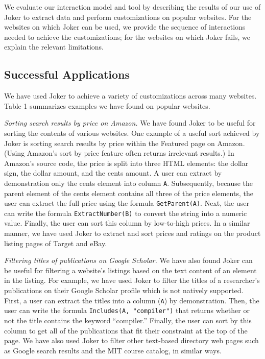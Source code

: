 \documentclass[sigconf,10pt]{acmart}
\begin{document}
We evaluate our interaction model and tool by describing the results of
our use of Joker to extract data and perform customizations on popular
websites. For the websites on which Joker can be used, we provide the
sequence of interactions needed to achieve the customizations; for the
websites on which Joker fails, we explain the relevant limitations.

\hypertarget{successful-applications}{%
\subsection{Successful Applications}\label{successful-applications}}

We have used Joker to achieve a variety of customizations across many
websites. Table 1 summarizes examples we have found on popular websites.

\emph{Sorting search results by price on Amazon.} We have found Joker to
be useful for sorting the contents of various websites. One example of a
useful sort achieved by Joker is sorting search results by price within
the Featured page on Amazon. (Using Amazon's sort by price feature often
returns irrelevant results.) In Amazon's source code, the price is split
into three HTML elements: the dollar sign, the dollar amount, and the
cents amount. A user can extract by demonstration only the cents element
into column \texttt{A}. Subsequently, because the parent element of the
cents element contains all three of the price elements, the user can
extract the full price using the formula \texttt{GetParent(A)}. Next,
the user can write the formula \texttt{ExtractNumber(B)} to convert the
string into a numeric value. Finally, the user can sort this column by
low-to-high prices. In a similar manner, we have used Joker to extract
and sort prices and ratings on the product listing pages of Target and
eBay.

\emph{Filtering titles of publications on Google Scholar.} We have also
found Joker can be useful for filtering a website's listings based on
the text content of an element in the listing. For example, we have used
Joker to filter the titles of a researcher's publications on their
Google Scholar profile which is not natively supported. First, a user
can extract the titles into a column (\texttt{A}) by demonstration.
Then, the user can write the formula \texttt{Includes(A,\ "compiler")}
that returns whether or not the title contains the keyword ``compiler.''
Finally, the user can sort by this column to get all of the publications
that fit their constraint at the top of the page. We have also used
Joker to filter other text-based directory web pages such as Google
search results and the MIT course catalog, in similar ways.
\end{document}
